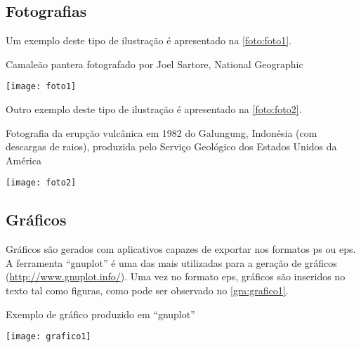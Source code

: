 \subsection{Fotografias}\label{sec:fotografias}

Um exemplo deste tipo de ilustração é apresentado na \autoref{foto:foto1}.

\begin{photograph}[htb]%
    \caption{Camaleão pantera fotografado por Joel Sartore, National Geographic}%
    \label{foto:foto1}%
    \texttt{[image: foto1]}%
\end{photograph}

Outro exemplo deste tipo de ilustração é apresentado na \autoref{foto:foto2}.

\begin{photograph}[htb]%
    \captionsetup{width=0.6\textwidth}%
    \caption{Fotografia da erupção vulcânica em 1982 do Galungung, Indonésia (com descargas de raios), produzida pelo Serviço Geológico dos Estados Unidos da América}%
    \label{foto:foto2}%
    \texttt{[image: foto2]}%
\end{photograph}

\subsection{Gráficos}\label{sec:graficos}

Gráficos são gerados com aplicativos capazes de exportar nos formatos \gls{ps} ou \gls{eps}. A ferramenta ``gnuplot'' é uma das mais utilizadas para a geração de gráficos (\url{http://www.gnuplot.info/}). Uma vez no formato \gls{eps}, gráficos são inseridos no texto tal como figuras, como pode ser observado no \autoref{gra:grafico1}.

\begin{graph}[htb]%
    \caption{Exemplo de gráfico produzido em ``gnuplot''}%
    \label{gra:grafico1}%
    \texttt{[image: grafico1]}%
\end{graph}

